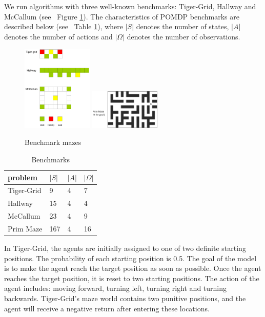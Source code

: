 \documentclass{article}
\begin{document}
We run algorithms with three well-known benchmarks: Tiger-Grid, Hallway and McCallum
(see ~Figure \ref{fig:mazes}). The characteristics of POMDP benchmarks are described
below (see ~Table \ref{table:benchmarks}), where $|S|$ denotes the number of states,
$|A|$ denotes the number of actions and $|\Omega|$ denotes the number of observations.

\begin{figure}[h]
  \centering
    \includegraphics[width=0.30\textwidth]{mazes.png}
    \includegraphics[width=0.30\textwidth]{06-13-21-48/prim_maze_with_caption.png}
  \caption{Benchmark mazes}
  \label{fig:mazes}
\end{figure}

\begin{table}[h]
  \caption{Benchmarks}
  \label{table:benchmarks}
  \centering
  \begin{tabular}{llll}
    \toprule
    problem         & $|S|$           & $|A|$          & $|\Omega|$\\
    \midrule
    Tiger-Grid      & 9              & 4              & 7        \\
    Hallway         & 15           & 4              & 4        \\
    McCallum        & 23              & 4              & 9        \\
    Prim Maze        & 167              & 4              & 16        \\
    \bottomrule
  \end{tabular}
\end{table}

In Tiger-Grid, the agents are initially assigned to one of two definite starting positions.
The probability of each starting position is 0.5. The goal of the model is to make the agent
reach the target position as soon as possible. Once the agent reaches the target position,
it is reset to two starting positions. The action of the agent includes: moving forward, turning left,
turning right and turning backwards. Tiger-Grid's maze world contains two punitive positions,
and the agent will receive a negative return after entering these locations. 
\end{document}
